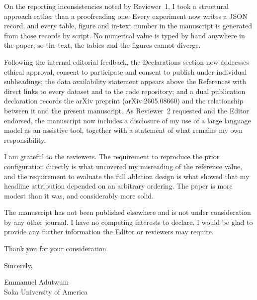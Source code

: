 \documentclass[11pt,a4paper]{article}
\begin{document}
On the reporting inconsistencies noted by Reviewer~1, I took a structural approach rather
than a proofreading one. Every experiment now writes a JSON record, and every table, figure
and in-text number in the manuscript is generated from those records by script. No numerical
value is typed by hand anywhere in the paper, so the text, the tables and the figures cannot
diverge.

Following the internal editorial feedback, the Declarations section now addresses ethical
approval, consent to participate and consent to publish under individual subheadings; the
data availability statement appears above the References with direct links to every dataset
and to the code repository; and a dual publication declaration records the arXiv preprint
(arXiv:2605.08660) and the relationship between it and the present manuscript. As Reviewer~2
requested and the Editor endorsed, the manuscript now includes a disclosure of my use of a
large language model as an assistive tool, together with a statement of what remains my own
responsibility.

I am grateful to the reviewers. The requirement to reproduce the prior configuration directly
is what uncovered my misreading of the reference value, and the requirement to evaluate the
full ablation design is what showed that my headline attribution depended on an arbitrary
ordering. The paper is more modest than it was, and considerably more solid.

The manuscript has not been published elsewhere and is not under consideration by any other
journal. I have no competing interests to declare. I would be glad to provide any further
information the Editor or reviewers may require.

\vspace{12pt}
\noindent Thank you for your consideration.

\vspace{18pt}
\noindent Sincerely,

\vspace{22pt}
\noindent Emmanuel Adutwum\\
Soka University of America
\end{document}
